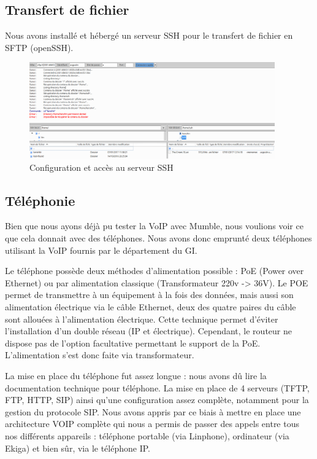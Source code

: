 \newpage
        
	\subsection{Transfert de fichier}
        Nous avons installé et hébergé un serveur SSH pour le transfert de fichier en SFTP (openSSH).

		\begin{figure}[!h]
          \includegraphics[width=400px]{figures/filezilla.png}
          \centering
          \caption{Configuration et accès au serveur SSH}
        \end{figure}

	\subsection{Téléphonie}
    
    Bien que nous ayons déjà pu tester la VoIP avec Mumble, nous voulions voir ce que cela donnait avec des téléphones. Nous avons donc emprunté deux téléphones utilisant la VoIP fournis par le département du GI.
    
    Le téléphone possède deux méthodes d'alimentation possible : PoE (Power over Ethernet) ou par alimentation classique (Transformateur 220v -> 36V).
    Le POE permet de transmettre à un équipement à la fois des données, mais aussi son alimentation électrique via le câble Ethernet, deux des quatre paires du câble sont allouées à l'alimentation électrique. Cette technique permet d'éviter l’installation d’un double réseau (IP et électrique). Cependant, le routeur ne dispose pas de l'option facultative permettant le support de la PoE. L'alimentation s'est donc faite via transformateur.
    
    La mise en place du téléphone fut assez longue : nous avons dû lire la documentation technique pour téléphone. La mise en place de 4 serveurs (TFTP, FTP, HTTP, SIP) ainsi qu'une configuration assez complète, notamment pour la gestion du protocole SIP. Nous avons appris par ce biais à mettre en place une architecture VOIP complète qui nous a permis de passer des appels entre tous nos différents appareils : téléphone portable (via Linphone), ordinateur (via Ekiga) et bien sûr, via le téléphone IP.
    
